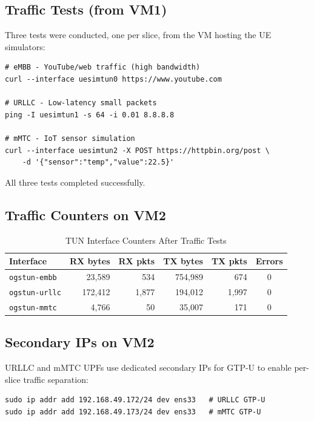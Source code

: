 \documentclass[12pt,a4paper]{article}
\begin{document}
\subsection{Traffic Tests (from VM1)}

Three tests were conducted, one per slice, from the VM hosting the UE simulators:

\begin{lstlisting}[style=terminal]
# eMBB - YouTube/web traffic (high bandwidth)
curl --interface uesimtun0 https://www.youtube.com

# URLLC - Low-latency small packets
ping -I uesimtun1 -s 64 -i 0.01 8.8.8.8

# mMTC - IoT sensor simulation
curl --interface uesimtun2 -X POST https://httpbin.org/post \
    -d '{"sensor":"temp","value":22.5}'
\end{lstlisting}

All three tests completed successfully.

\subsection{Traffic Counters on VM2}

\begin{table}[H]
\centering
\begin{tabular}{lrrrrc}
\toprule
\textbf{Interface} & \textbf{RX bytes} & \textbf{RX pkts} & \textbf{TX bytes} & \textbf{TX pkts} & \textbf{Errors} \\
\midrule
\texttt{ogstun-embb}  & 23,589  & 534   & 754,989 & 674   & 0 \\
\texttt{ogstun-urllc} & 172,412 & 1,877 & 194,012 & 1,997 & 0 \\
\texttt{ogstun-mmtc}  & 4,766   & 50    & 35,007  & 171   & 0 \\
\bottomrule
\end{tabular}
\caption{TUN Interface Counters After Traffic Tests}
\end{table}

\subsection{Secondary IPs on VM2}

URLLC and mMTC UPFs use dedicated secondary IPs for GTP-U to enable per-slice traffic separation:

\begin{lstlisting}[style=terminal]
sudo ip addr add 192.168.49.172/24 dev ens33   # URLLC GTP-U
sudo ip addr add 192.168.49.173/24 dev ens33   # mMTC GTP-U
\end{lstlisting}
\end{document}
